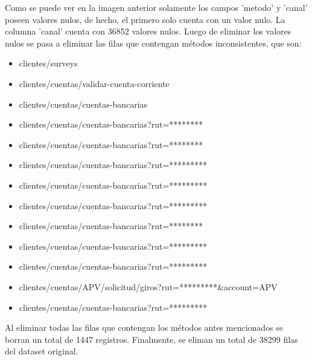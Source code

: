Como se puede ver en la imagen anterior solamente los campos 'metodo' y 'canal' poseen valores nulos, de hecho, el primero solo cuenta con un valor nulo. La columna 'canal' cuenta con 36852 valores nulos. Luego de eliminar los valores nulos se pasa a eliminar las filas que contengan métodos inconsistentes, que son:
\begin{itemize}
    \item clientes/surveys
    \item clientes/cuentas/validar-cuenta-corriente
    \item clientes/cuentas/cuentas-bancarias
    \item clientes/cuentas/cuentas-bancarias?rut=******** 
    \item clientes/cuentas/cuentas-bancarias?rut=********
    \item clientes/cuentas/cuentas-bancarias?rut=*********
    \item clientes/cuentas/cuentas-bancarias?rut=*********
    \item clientes/cuentas/cuentas-bancarias?rut=*********
    \item clientes/cuentas/cuentas-bancarias?rut=********
    \item clientes/cuentas/cuentas-bancarias?rut=*********
    \item clientes/cuentas/cuentas-bancarias?rut=*********
    \item clientes/cuentas/APV/solicitud/giros?rut=*********\&account=APV
    \item clientes/cuentas/cuentas-bancarias?rut=*********
\end{itemize}

Al eliminar todas las filas que contengan los métodos antes mencionados se borran un total de 1447 registros. Finalmente, se eliman un total de 38299 filas del dataset original.